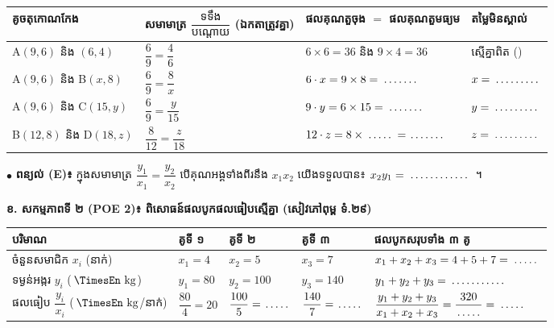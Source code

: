 \documentclass[a4paper,10pt]{article}
\newcommand{\en}[1]{{\TimesEn #1}}
\newcommand{\unit}[1]{\,\text{\en{#1}}}
\newcommand{\blank}[1][1.5cm]{\makebox[#1]{\dotfill}}
\begin{document}
{\renewcommand{\arraystretch}{1.48}
\begin{tabular}{|C{3.30cm}|L{5.65cm}|L{5.25cm}|C{3.40cm}|}
  \hline
  \textbf{គូចតុកោណកែង} & \textbf{សមាមាត្រ $\dfrac{\text{ទទឹង}}{\text{បណ្ដោយ}}$ (ឯកតាត្រូវគ្នា)} & \textbf{ផលគុណតួចុង $=$ ផលគុណតួមធ្យម} & \textbf{តម្លៃមិនស្គាល់} \\
  \hline
  \en{A}$(9,6)$ និង $(6,4)$ & $\dfrac{6}{9} = \dfrac{4}{6}$ & $6\times 6 = 36$ \;និង\; $9\times 4 = 36$ & ស្មើគ្នាពិត () \\
  \hline
  \en{A}$(9,6)$ និង \en{B}$(x,8)$ & $\dfrac{6}{9} = \dfrac{8}{x}$ & $6\cdot x = 9\times 8 = \blank[1.2cm]$ & $x = \blank[1.5cm]$ \\
  \hline
  \en{A}$(9,6)$ និង \en{C}$(15,y)$ & $\dfrac{6}{9} = \dfrac{y}{15}$ & $9\cdot y = 6\times 15 = \blank[1.2cm]$ & $y = \blank[1.5cm]$ \\
  \hline
  \en{B}$(12,8)$ និង \en{D}$(18,z)$ & $\dfrac{8}{12} = \dfrac{z}{18}$ & $12\cdot z = 8\times \blank[0.9cm] = \blank[1.1cm]$ & $z = \blank[1.5cm]$ \\
  \hline
\end{tabular}}

\vspace{3pt}
$\bullet$ \textbf{ពន្យល់ (\en{E})៖} ក្នុងសមាមាត្រ $\dfrac{y_1}{x_1} = \dfrac{y_2}{x_2}$ បើគុណអង្គទាំងពីរនឹង $x_1 x_2$ យើងទទួលបាន៖ $x_2 y_1 = \blank[2.0cm]$ ។

\vspace{4pt}
\textbf{ខ. សកម្មភាពទី ២ (\en{POE 2})៖ ពិសោធន៍ផលបូកផលធៀបស្មើគ្នា (សៀវភៅពុម្ព ទំ.២៩)}

{\renewcommand{\arraystretch}{1.48}
\begin{tabular}{|L{4.80cm}|C{2.45cm}|C{2.45cm}|C{2.45cm}|C{5.25cm}|}
  \hline
  \textbf{បរិមាណ} & \textbf{គូទី ១} & \textbf{គូទី ២} & \textbf{គូទី ៣} & \textbf{ផលបូកសរុបទាំង ៣ គូ} \\
  \hline
  ចំនួនសមាជិក $x_i$ (នាក់) & $x_1 = 4$ & $x_2 = 5$ & $x_3 = 7$ & $x_1+x_2+x_3 = 4+5+7 = \blank[0.9cm]$ \\
  \hline
  ទម្ងន់អង្ករ $y_i$ ($\unit{kg}$) & $y_1 = 80$ & $y_2 = 100$ & $y_3 = 140$ & $y_1+y_2+y_3 = \blank[1.8cm]$ \\
  \hline
  ផលធៀប $\dfrac{y_i}{x_i}$ ($\unit{kg}$/នាក់) & $\dfrac{80}{4} = 20$ & $\dfrac{100}{5} = \blank[0.8cm]$ & $\dfrac{140}{7} = \blank[0.8cm]$ & $\dfrac{y_1+y_2+y_3}{x_1+x_2+x_3} = \dfrac{320}{\blank[0.8cm]} = \blank[0.9cm]$ \\
  \hline
\end{tabular}}
\end{document}
